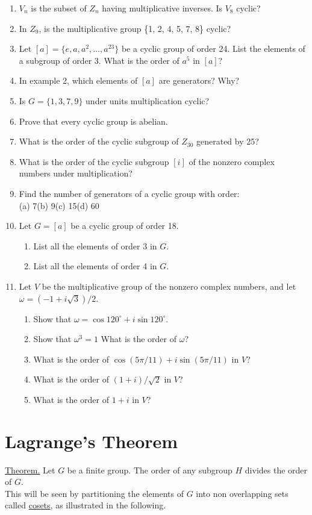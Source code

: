 \documentclass[12pt]{book}
\theoremstyle{definition}
\begin{document}
\begin{enumerate}
\item$V_n$ is the subset of $Z_n$ having multiplicative inverses.  Is $V_8$ cyclic?
\item In $Z_9$, is the multiplicative group \{1, 2, 4, 5, 7, 8\} cyclic?
\item Let $[a]=\{e, a, a^2, \dots, a^{23}\}$ be a cyclic group of order 24.  List the elements of  a subgroup of order 3.   What is the order of $a^5$ in $[a]$?
\item In example 2, which elements of $[a]$ are generators?  Why?
\item Is $G=\{1,3,7,9\}$ under units multiplication cyclic?
\item Prove that every cyclic group is abelian.
\item What is the order of the cyclic subgroup of $Z_{30}$ generated by 25?
\item What is the order of the cyclic subgroup $[i]$ of the nonzero complex numbers under multiplication?
\item Find the number of generators of a cyclic group with order:\\
(a) 7\qquad(b) 9\qquad(c) 15\qquad(d) 60
\item Let $G=[a]$ be a cyclic group of order 18.
\begin{enumerate}
\item List all the elements of order 3 in $G$.
\item List all the elements of order 4 in $G$.
\end{enumerate}
\item Let $V$ be the multiplicative group of the nonzero complex numbers, and let $\omega=(-1+i\sqrt3)/2$.
\begin{enumerate}
\item Show that $\omega=\cos120^\circ+i\sin120^\circ$.
\item Show that $\omega^3=1$  What is the order of $\omega$?
\item What is the order of $\cos(5\pi/11) + i \sin(5\pi/11)$ in $V$?
\item What is the order of $(1+i)/\sqrt2$ in $V$?
\item What is the order of $1+i$ in $V$?
\end{enumerate}
\end{enumerate}

\section{Lagrange's Theorem}
\underline{Theorem.}   Let $G$ be a finite group.  The order of any subgroup $H$ divides the order of $G$.\\
%
This will be seen by partitioning the elements of $G$ into non overlapping sets called \underline{cosets}, as illustrated in the following.
\end{document}
